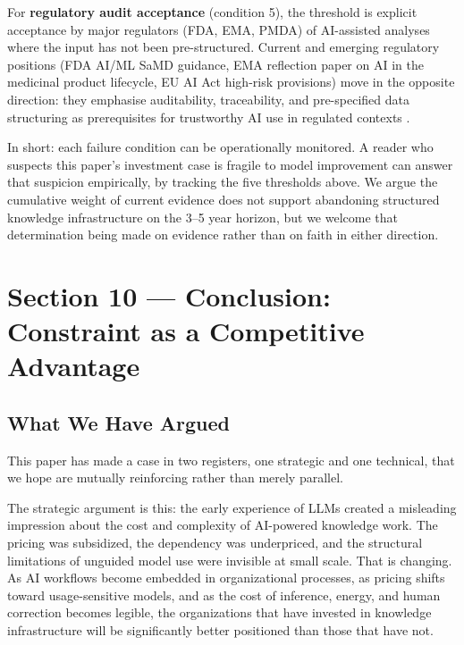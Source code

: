 \documentclass[man,12pt,donotrepeattitle]{apa7}
\begin{document}
For \textbf{regulatory audit acceptance} (condition 5), the threshold is
explicit acceptance by major regulators (FDA, EMA, PMDA) of AI-assisted
analyses where the input has not been pre-structured. Current and emerging
regulatory positions (FDA AI/ML SaMD guidance, EMA reflection paper on AI
in the medicinal product lifecycle, EU AI Act high-risk provisions) move in
the opposite direction: they emphasise auditability, traceability, and
pre-specified data structuring as prerequisites for trustworthy AI use in
regulated contexts \parencite{fda2025,ema2024,euaiact2024}.

In short: each failure condition can be operationally monitored. A reader
who suspects this paper's investment case is fragile to model improvement
can answer that suspicion empirically, by tracking the five thresholds
above. We argue the cumulative weight of current evidence does not support
abandoning structured knowledge infrastructure on the 3--5 year horizon,
but we welcome that determination being made on evidence rather than on
faith in either direction.


\section{Section 10 --- Conclusion: Constraint as a Competitive Advantage}

\subsection{What We Have Argued}

This paper has made a case in two registers, one strategic and one
technical, that we hope are mutually reinforcing rather than merely parallel.

The strategic argument is this: the early experience of LLMs created a
misleading impression about the cost and complexity of AI-powered knowledge
work. The pricing was subsidized, the dependency was underpriced, and the
structural limitations of unguided model use were invisible at small scale.
That is changing. As AI workflows become embedded in organizational
processes, as pricing shifts toward usage-sensitive models, and as the cost
of inference, energy, and human correction becomes legible, the organizations
that have invested in knowledge infrastructure will be significantly better
positioned than those that have not.
\end{document}
